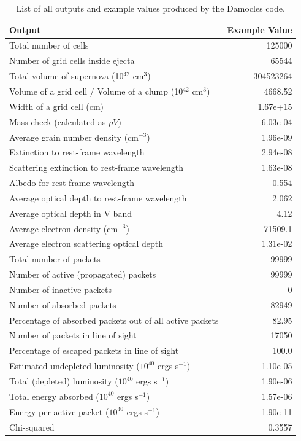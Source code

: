 \begin{table}[htdp]
\caption{List of all outputs and example values produced by the Damocles code.}
\begin{center}
\def\arraystretch{1.5}
\begin{tabular}{ l  r}
\toprule
Output & Example Value \\
\midrule
Total number of cells      & 125000 \\
Number of grid cells inside ejecta   & 65544 \\
Total volume of supernova (10$^{42}$ cm$^3$)   & 304523264 \\
Volume of a grid cell / Volume of a clump (10$^{42}$ cm$^3$)   & 4668.52\\
Width of a grid cell (cm) &   1.67e+15\\
\midrule
Mass check (calculated as $\rho V$)   & 6.03e-04 \\
\midrule
 Average grain number density (cm$^{-3}$)  & 1.96e-09\\
 Extinction to rest-frame wavelength  & 2.94e-08 \\
 Scattering extinction to rest-frame wavelength  & 1.63e-08 \\
 Albedo for rest-frame wavelength & 0.554 \\
 Average optical depth to rest-frame wavelength  & 2.062 \\
 Average optical depth in V band  & 4.12 \\
 \midrule
 Average electron density (cm$^{-3}$) & 71509.1 \\
Average electron scattering optical depth &   1.31e-02\\
\midrule
 Total number of packets      &          99999\\
 Number of active (propagated) packets      &          99999\\
 Number of inactive packets        &            0\\
Number of absorbed packets      &          82949   \\
Percentage of absorbed packets out of all active packets & 82.95 \\
Number of packets in line of sight  & 17050       \\
Percentage of escaped packets in line of sight & 100.0 \\
\midrule
Estimated undepleted luminosity ($10^{40}$ ergs s$^{-1}$)  & 1.10e-05\\
Total (depleted) luminosity ($10^{40}$ ergs s$^{-1}$) & 1.90e-06\\
Total energy absorbed ($10^{40}$ ergs s$^{-1}$) &  1.57e-06\\
Energy per active packet ($10^{40}$ ergs s$^{-1}$) & 1.90e-11\\
\midrule
Chi-squared	& 0.3557  \\
\bottomrule
\end{tabular}
\end{center}
\label{tb:outputs}
\end{table}%

